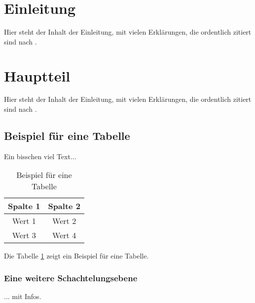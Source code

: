 \documentclass[12pt, a4paper, twoside]{article} %
\begin{document}
\newpage
\tableofcontents

\newpage
\listoffigures
\listoftables

\newpage
\section{Einleitung}
Hier steht der Inhalt der Einleitung, mit vielen Erklärungen, die ordentlich zitiert sind nach \cite[S. 25ff.]{example}.


\newpage
\section{Hauptteil}
Hier steht der Inhalt der Einleitung, mit vielen Erklärungen, die ordentlich zitiert sind nach \cite{bookexample}.


\subsection{Beispiel für eine Tabelle}

Ein bisschen viel Text... \lipsum[1]

\begin{table}[h]
\centering
\caption{Beispiel für eine Tabelle}
\label{tab:beispiel}
    \begin{tabular}{cc}
        \toprule
        Spalte 1 & Spalte 2 \\
        \midrule
        Wert 1 & Wert 2 \\
        Wert 3 & Wert 4 \\
        \bottomrule
    \end{tabular}
\end{table}

Die Tabelle \ref{tab:beispiel} zeigt ein Beispiel für eine Tabelle. \lipsum[1]


\subsubsection{Eine weitere Schachtelungsebene}
... mit Infos.
\end{document}
